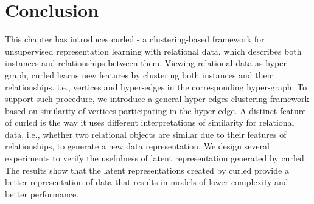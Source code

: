 \section{Conclusion}
\label{sec:Conc}


This chapter has introduces \gls{curled} - a clustering-based framework for unsupervised representation learning with relational data, which describes both instances and relationships between them.
Viewing relational data as hyper-graph, \gls{curled} learns new features by clustering both instances and their relationships. i.e., vertices and hyper-edges in the corresponding hyper-graph.
To support such procedure, we introduce a general hyper-edges clustering framework based on similarity of vertices participating in the hyper-edge.
A distinct feature of \gls{curled} is the way it uses different interpretations of similarity for relational data, i.e., whether two relational objects are similar due to their features of relationships, to generate a new data representation.
We design several experiments to verify the usefulness of latent representation generated by \gls{curled}.
The results show that the latent representations created by \gls{curled} provide a better representation of data that results in models of lower complexity and better performance.




\cleardoublepage


